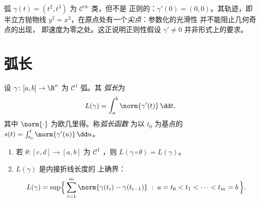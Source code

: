\begin{example}\label{ex:b2:curves:cusp}
弧 $\gamma(t) = (t^2, t^3)$ 为 $\mathcal{C}^\infty$ 类，但不是
正则的：$\gamma'(0) = (0, 0)$。其轨迹，即半立方抛物线
$y^2 = x^3$，在原点处有一个\emph{尖点}：参数化的光滑性
并不能阻止几何奇点的出现，
即速度为零之处。这正说明正则性假设
$\gamma' \neq 0$ 并非形式上的要求。
\end{example}

\section{弧长}

\begin{definition}[弧长]\label{def:b2:curves:length}
设 $\gamma \colon [a, b] \to \R^n$ 为 $\mathcal{C}^1$ 弧。其
\emph{弧长}为
\[
L(\gamma) = \int_a^b \norm{\gamma'(t)}\, \dd t ,
\]
其中 $\norm{\cdot}$ 为欧几里得。称\emph{弧长函数}
为以 $t_0$ 为基点的 $s(t) = \int_{t_0}^t
\norm{\gamma'(u)}\,\dd u$。
\end{definition}

\begin{theorem}[弧长是几何量；折线
刻画]\label{thm:b2:curves:lengthinv}
\leavevmode
\begin{enumerate}
\item 若 $\theta \colon [c, d] \to [a, b]$ 为 $\mathcal{C}^1$
，则 $L(\gamma \circ \theta) = L(\gamma)$。
\item $L(\gamma)$ 是内接折线长度的
上确界：
\[
L(\gamma)
= \sup\Bigl\{\, \sum_{i=1}^{m} \norm{\gamma(t_i) -
\gamma(t_{i-1})} \;:\; a = t_0 < t_1 < \dots < t_m = b \,\Bigr\}.
\]
\end{enumerate}
\end{theorem}

